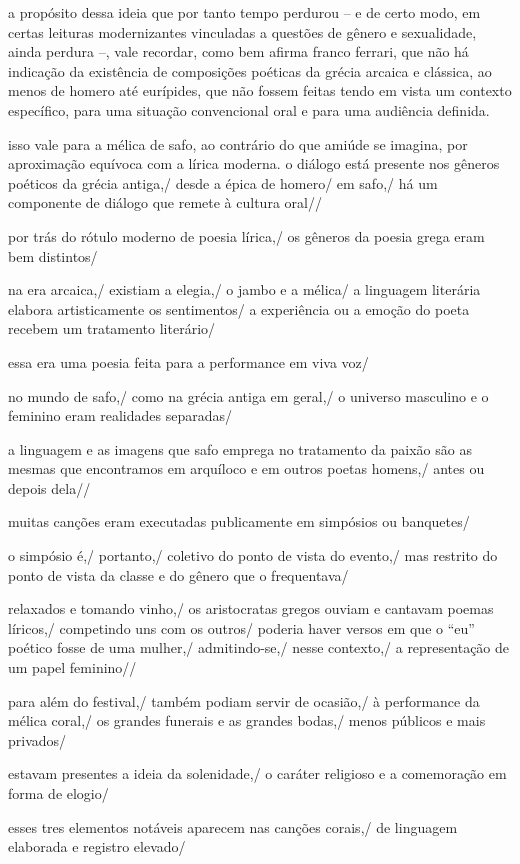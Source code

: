\documentclass[12pt]{extarticle}
\begin{document}
a propósito dessa ideia que por tanto tempo perdurou – e de certo modo, em certas leituras modernizantes vinculadas a questões de gênero e sexualidade, ainda perdura –, vale recordar, como bem afirma franco ferrari, que não há indicação da existência de composições poéticas da grécia arcaica e clássica, ao menos de homero até eurípides, que não fossem feitas tendo em vista um contexto específico, para uma situação convencional oral e para uma audiência definida. 

isso vale para a mélica de safo, ao contrário do que amiúde se imagina, por aproximação equívoca com a lírica moderna.
o diálogo está presente nos gêneros poéticos da grécia antiga,/ desde a épica de homero/ em safo,/ há um componente de diálogo que remete à cultura oral//
 
por trás do rótulo moderno de poesia lírica,/ os gêneros da poesia grega eram bem distintos/ 
 
na era arcaica,/ existiam a elegia,/ o jambo e a mélica/
a linguagem literária elabora artisticamente os sentimentos/  a experiência ou a emoção do poeta recebem um tratamento literário/
 
essa era uma poesia feita para a performance em viva voz/

no mundo de safo,/ como na grécia antiga em geral,/ o universo masculino e o feminino eram realidades separadas/

a linguagem e as imagens que safo emprega no tratamento da paixão são as mesmas que encontramos em arquíloco e em outros poetas homens,/ antes ou depois dela//

muitas canções eram executadas publicamente em simpósios ou banquetes/

o simpósio é,/ portanto,/ coletivo do ponto de vista do evento,/ mas restrito do ponto de vista da classe e do gênero que o frequentava/

relaxados e tomando vinho,/ os aristocratas gregos ouviam e cantavam poemas líricos,/ competindo uns com os outros/ poderia haver versos em que o “eu” poético fosse de uma mulher,/ admitindo-se,/ nesse contexto,/ a representação de um papel feminino// 

para além do festival,/ também podiam servir de ocasião,/ à performance da mélica coral,/ os grandes funerais e as grandes bodas,/ menos públicos e mais privados/

estavam presentes a ideia da solenidade,/ o caráter religioso e a comemoração em forma de elogio/

esses tres elementos notáveis aparecem nas canções corais,/ de linguagem elaborada e registro elevado/
\end{document}
